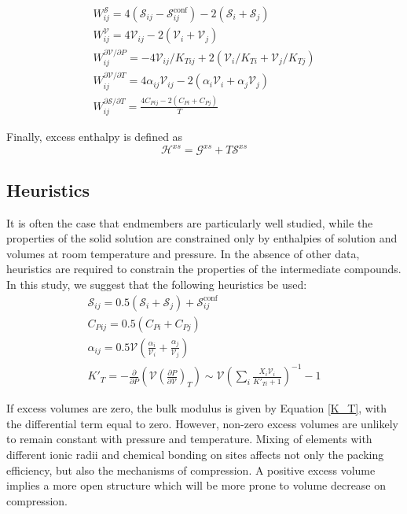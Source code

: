 \documentclass[review]{elsarticle}
\begin{document}
\begin{eqnarray}
  W^{\mathcal{S}}_{ij} = 4 (\mathcal{S}_{ij} - \mathcal{S}^{\textrm{conf}}_{ij}) - 2(\mathcal{S}_i + \mathcal{S}_j) \\
  W^{\mathcal{V}}_{ij} = 4 \mathcal{V}_{ij} - 2(\mathcal{V}_i + \mathcal{V}_j) \\
  W^{\partial\mathcal{V}/\partial P}_{ij} = -4 \mathcal{V}_{ij}/K_{T{ij}} + 2(\mathcal{V}_{i}/K_{T{i}} + \mathcal{V}_{j}/K_{T{j}}) \\
  W^{\partial\mathcal{V}/\partial T}_{ij} = 4 \alpha_{ij} \mathcal{V}_{ij} - 2(\alpha_{i} \mathcal{V}_i + \alpha_{j} \mathcal{V}_j) \\
  W^{\partial\mathcal{S}/\partial T}_{ij} = \frac{4 C_{P{ij}} - 2(C_{P{i}} + C_{P{j}})}{T} 
\end{eqnarray}

Finally, excess enthalpy is defined as
\begin{equation}
 \mathcal{H}^{xs} = \mathcal{G}^{xs} + T\mathcal{S}^{xs}
\end{equation}

\subsection{Heuristics}
It is often the case that endmembers are particularly well studied, while the properties of the solid solution are constrained only by enthalpies of solution and volumes at room temperature and pressure. In the absence of other data, heuristics are required to constrain the properties of the intermediate compounds. In this study, we suggest that the following heuristics be used:
\begin{eqnarray}
  \mathcal{S}_{ij} = 0.5(\mathcal{S}_i + \mathcal{S}_j) + \mathcal{S}^{\textrm{conf}}_{ij} \\
  C_{P{ij}} = 0.5(C_{P{i}} + C_{P{j}}) \\
  \alpha_{ij} = 0.5 \mathcal{V} \left(\frac{\alpha_i}{\mathcal{V}_i} + \frac{\alpha_j}{\mathcal{V}_j}\right)\\
  K'_{T} = -\frac{\partial}{\partial P} \left (\mathcal{V}\left( \frac{\partial P}{\partial \mathcal{V}} \right)_T \right) \sim \mathcal{V} \left(\sum_i \frac{X_i \mathcal{V}_i}{K'_{Ti} + 1} \right)^{-1} - 1
\end{eqnarray}

If excess volumes are zero, the bulk modulus is given by Equation \ref{K_T}, with the differential term equal to zero. However, non-zero excess volumes are unlikely to remain constant with pressure and temperature. Mixing of elements with different ionic radii and chemical bonding on sites affects not only the packing efficiency, but also the mechanisms of compression. A positive excess volume implies a more open structure which will be more prone to volume decrease on compression.
\end{document}
